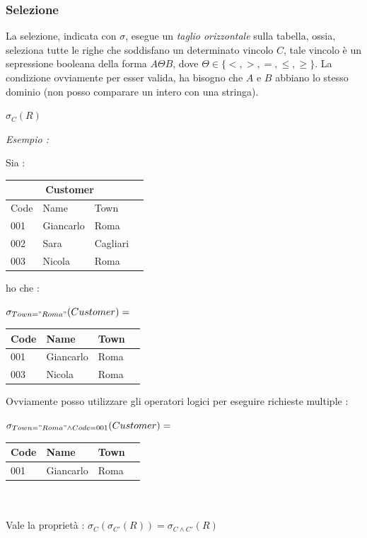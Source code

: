\documentclass[12pt, letterpaper]{article}
\begin{document}
\subsubsection{Selezione}
La selezione, indicata con \(\sigma\), esegue un \textit{taglio orizzontale} sulla tabella, ossia, seleziona tutte le righe 
che soddisfano un determinato vincolo \(C\), tale vincolo è un sepressione booleana della forma 
\(A\Theta B\), dove \(\Theta\in\{<,>,=,\le,\ge\}\). La condizione ovviamente per esser valida, ha bisogno 
che \(A\) e \(B\) abbiano lo stesso dominio (non posso comparare un intero con una stringa).\begin{center}
    \( \sigma_{C}(R)\)
\end{center}
\textit{Esempio :}\begin{center} Sia : 
    \begin{tabular}{|l|l|l|r|}
        \hline
    \multicolumn{3}{|c|}{\textbf{Customer}}\\
        \hline
        Code & Name & Town \\
        \hline
        001 & Giancarlo & Roma \\
        \hline
        002 & Sara & Cagliari \\
        \hline
        003 & Nicola & Roma \\
        \hline
        \end{tabular}
        ho che :\end{center}\begin{center}  \( \sigma_{Town="Roma"}(Customer)=\)
        \begin{tabular}{|l|l|l|r|}
            \hline
   
            Code & Name & Town \\
            \hline
            001 & Giancarlo & Roma \\
            \hline
            003 & Nicola & Roma \\
            \hline
            \end{tabular}
\end{center}
Ovviamente posso utilizzare gli operatori logici per eseguire richieste multiple :
\begin{center}  \( \sigma_{Town="Roma"\land Code=001}(Customer)=\)
    \begin{tabular}{|l|l|l|r|}
        
        \hline
        Code & Name & Town \\
        \hline
        001 & Giancarlo & Roma \\
        \hline
        \end{tabular}
        \\\hphantom{.}\\Vale la proprietà : \(\sigma_{C}(\sigma_{C'}(R))=\sigma_{C\land C'}(R)\)
    \end{center}
\end{document}
